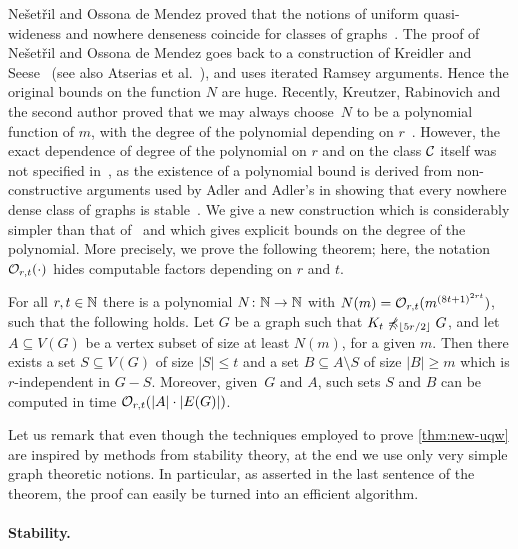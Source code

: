 Ne\v{s}et\v{r}il and Ossona de Mendez proved that
the notions of uniform quasi-wideness and nowhere denseness coincide for 
classes of graphs~\cite{nevsetvril2011nowhere}. 
The proof of Ne\v{s}et\v{r}il 
and Ossona de Mendez goes back to a construction
of Kreidler and Seese~\cite{kreidler1998monadic} (see also Atserias et al.~\cite{atserias2006preservation}), 
and uses iterated Ramsey arguments. Hence the original bounds on 
the function $N$ are huge. Recently, Kreutzer, Rabinovich and the second author
 proved that we may always choose~$N$ to be a polynomial 
function of $m$, with the degree of the polynomial depending on $r$~\cite{siebertz2016polynomial}. However, the exact dependence of degree of the polynomial on $r$ and on the class $\mathcal{C}$ itself
 was  not specified in~\cite{siebertz2016polynomial}, as the existence of a polynomial bound is derived
from non-constructive arguments used by Adler and Adler's in showing that every nowhere dense class of graphs
is stable~\cite{adler2014interpreting}. We give a new construction 
which is considerably simpler than that of~\cite{siebertz2016polynomial}
and which gives explicit bounds on the degree of the polynomial. 
More precisely, we prove the following theorem; here, the notation $\mathcal{O}_{r,t}(\cdot)$ hides computable factors depending on $r$ and $t$.

\begin{theorem}\label{thm:new-uqw}
For all $r,t\in \mathbb{N}$ there is a polynomial  $N\colon \mathbb{N}\to \mathbb{N}$ with $N(m)=
\mathcal{O}_{r,t}{(m^{{(8t+1)}^{2rt}})}$, such that the following holds.
Let $G$ be a graph such that $K_t\not\preccurlyeq_{\lfloor 5r/2\rfloor} G$, and
let $A\subseteq V(G)$ be a vertex subset of size at least $N(m)$, for a given $m$.
Then there exists a set $S\subseteq V(G)$ of size $|S|\leq t$ and a set $B\subseteq A\setminus S$ 
of size $|B|\geq m$ which is $r$-independent in $G-S$.
Moreover, given~$G$ and $A$, such sets $S$ and $B$ can be computed in time $\mathcal{O}_{r,t}(|A|\cdot |E(G)|)$. 
\end{theorem}

Let us remark
that even though the techniques employed to prove \cref{thm:new-uqw} are inspired by methods from stability theory, 
at the end we use only very simple graph theoretic notions. In particular, as asserted in the last sentence of the theorem, the
proof can easily be turned into an efficient algorithm.

\paragraph{Stability.}


